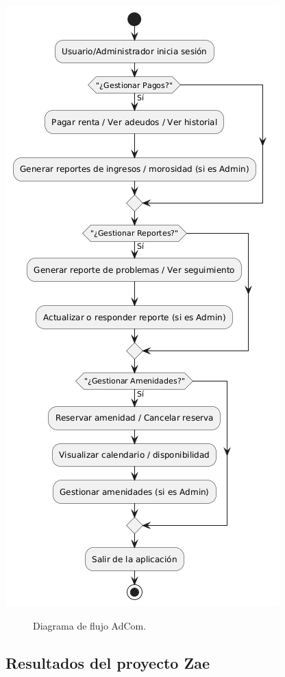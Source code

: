 \documentclass[protocolo.tex]{subfiles}
\begin{document}
\begin{center}
\includegraphics[scale=0.5]{Imagenes/adcom.png}
\end{center}
\begin{figure}[h]  %
    \centering
    \caption{Diagrama de flujo AdCom.}
    \label{fig:mi-figura5}
\end{figure}

\subsection{Resultados del proyecto Zae}
\end{document}
